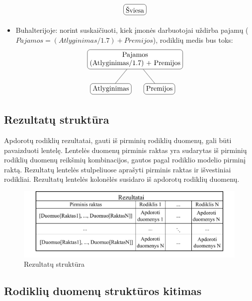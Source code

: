 \documentclass{VUMIFPSbakalaurinis}
\begin{document}
\begin{itemize}
\[\begin{tikzpicture}[sibling distance=7em, every node/.style = {shape=rectangle, rounded                                corners, draw, align=center,	
                                top color=white, bottom color=white}]
            \node{Šviesa};
        \end{tikzpicture} 	
    \]
    \item Buhalterijoje: norint suskaičiuoti, kiek įmonės darbuotojai uždirba pajamų (\(\textit{Pajamos} = (\textit{Atlyginimas}/1.7) + \textit{Premijos}\)), rodiklių medis bus toks: 
    \[	
        \begin{tikzpicture}[sibling distance=7em,	
            every node/.style = {shape=rectangle, rounded corners,	
                                 draw, align=center,	
                                 top color=white, bottom color=white}]	
            \node {Pajamos\\(Atlyginimas/1.7) + Premijos}	
                    child { node {Atlyginimas} }	
                    child { node {Premijos} } ;	
        \end{tikzpicture} 	
    \]
\end{itemize}  


\subsection{Rezultatų struktūra}

Apdorotų rodiklių rezultatai, gauti iš pirminių rodiklių duomenų, gali būti pavaizduoti lentelę. Lentelės duomenų pirminis raktas yra sudarytas iš pirminių rodiklių duomenų reikšmių kombinacijos, gautos pagal rodiklio modelio pirminį raktą. Rezultatų lentelės stulpeliuose aprašyti pirminis raktas ir išvestiniai rodikliai. Rezultatų lentelės kolonėlės susidaro iš apdorotų rodiklių duomenų.

\begin{figure}[H]
    \centering
    \includegraphics[width=1\textwidth]{img/rezultatai.pdf}
    \caption{Rezultatų struktūra}
    \label{img:rezultatai}
\end{figure}

\subsection{Rodiklių duomenų struktūros kitimas}
\end{document}
